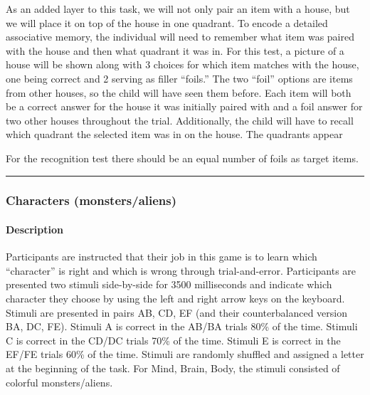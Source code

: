 \documentclass[
]{book}
\begin{document}
As an added layer to this task, we will not only pair an item with a house, but we will place it on top of the house in one quadrant. To encode a detailed associative memory, the individual will need to remember what item was paired with the house and then what quadrant it was in. For this test, a picture of a house will be shown along with 3 choices for which item matches with the house, one being correct and 2 serving as filler ``foils.'' The two ``foil'' options are items from other houses, so the child will have seen them before. Each item will both be a correct answer for the house it was initially paired with and a foil answer for two other houses throughout the trial. Additionally, the child will have to recall which quadrant the selected item was in on the house. The quadrants appear

For the recognition test there should be an equal number of foils as target items.

\begin{center}\rule{0.5\linewidth}{0.5pt}\end{center}

\hypertarget{characters-monstersaliens}{%
\subsubsection{Characters (monsters/aliens)}\label{characters-monstersaliens}}

\hypertarget{description-3}{%
\paragraph{Description}\label{description-3}}

Participants are instructed that their job in this game is to learn which ``character'' is right and which is wrong through trial-and-error. Participants are presented two stimuli side-by-side for 3500 milliseconds and indicate which character they choose by using the left and right arrow keys on the keyboard. Stimuli are presented in pairs AB, CD, EF (and their counterbalanced version BA, DC, FE). Stimuli A is correct in the AB/BA trials 80\% of the time. Stimuli C is correct in the CD/DC trials 70\% of the time. Stimuli E is correct in the EF/FE trials 60\% of the time. Stimuli are randomly shuffled and assigned a letter at the beginning of the task. For Mind, Brain, Body, the stimuli consisted of colorful monsters/aliens.
\end{document}
